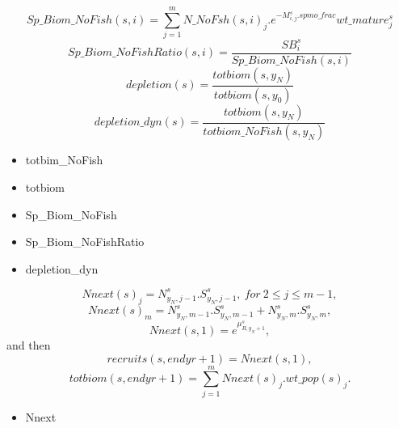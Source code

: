 \documentclass{article}
\begin{document}
\begin{equation}
Sp\_Biom\_NoFish(s,i)=\sum_{j=1}^m N\_NoFsh(s,i)_j.e^{-M^s_{i,j}.spmo\_frac}wt\_mature^s_j
\end{equation}
\begin{equation}
    Sp\_Biom\_NoFishRatio(s,i)=\dfrac{SB^s_i}{Sp\_Biom\_NoFish(s,i)}
\end{equation}
\begin{equation}
    depletion(s)=\dfrac{totbiom(s,y_N)}{totbiom(s,y_0)}
\end{equation}
\begin{equation}
    depletion\_dyn(s)=\dfrac{totbiom(s,y_N)}{totbiom\_NoFish(s,y_N)}
\end{equation}
\begin{itemize}
    \item totbim\_NoFish
    \item totbiom
    \item Sp\_Biom\_NoFish
    \item Sp\_Biom\_NoFishRatio
    \item depletion\_dyn
\end{itemize}
\begin{equation}
Nnext(s)_j=N^s_{y_N,j-1}.S^s_{y_N,j-1}, \ for \ 2\leq j\leq m-1,
\end{equation}
\begin{equation}
Nnext(s)_m=N^s_{y_N,m-1}.S^s_{y_N,m-1}+N^s_{y_N,m}.S^s_{y_N,m},
\end{equation}
\begin{equation}
    Nnext(s,1)=e^{\mu^s_{R,y_N+1}},
\end{equation}
and then
\begin{equation}
recruits(s,endyr+1)=Nnext(s,1),
\end{equation}
\begin{equation}
totbiom(s,endyr+1)=\sum_{j=1}^mNnext(s)_j.wt\_pop(s)_j.
\end{equation}
\begin{itemize}
    \item Nnext

\end{itemize}
\end{document}
